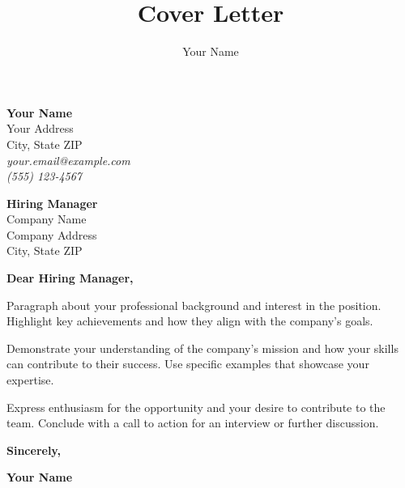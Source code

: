 \documentclass[11pt,a4paper]{memoir}
\title{Cover Letter}
\author{Your Name}
\date{}
\begin{document}
\maketitle

\noindent\color{textcolor}
\begin{minipage}[t]{0.45\textwidth}
\textbf{Your Name} \\
Your Address \\
City, State ZIP \\
\textit{your.email@example.com} \\
\textit{(555) 123-4567}
\end{minipage}
\hfill
\begin{minipage}[t]{0.45\textwidth}
\textbf{Hiring Manager} \\
Company Name \\
Company Address \\
City, State ZIP
\end{minipage}

\vspace{1cm}

\noindent\color{textcolor}
\textbf{Dear Hiring Manager,}

\lipsum[1-2]

Paragraph about your professional background and interest in the position. Highlight key achievements and how they align with the company's goals.

Demonstrate your understanding of the company's mission and how your skills can contribute to their success. Use specific examples that showcase your expertise.

Express enthusiasm for the opportunity and your desire to contribute to the team. Conclude with a call to action for an interview or further discussion.

\vspace{1cm}

\noindent\textbf{Sincerely,}

\vspace{1cm}

\noindent\textbf{Your Name}
\end{document}

